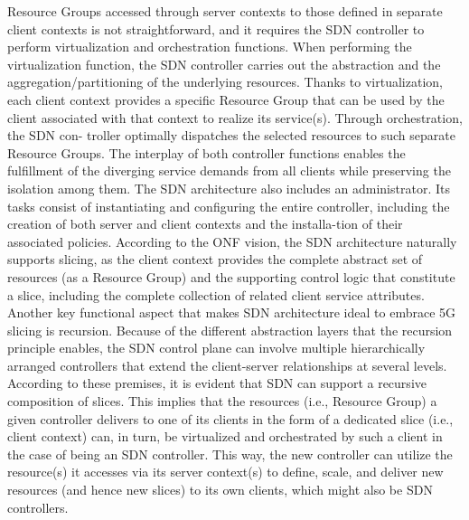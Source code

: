 \documentclass{article}
\begin{document}
Resource Groups accessed through server contexts to those defined in separate client contexts
is not straightforward, and it requires the SDN
controller to perform virtualization and orchestration functions.
When performing the virtualization function, the
SDN controller carries out the abstraction and the
aggregation/partitioning of the underlying resources. Thanks to virtualization, each client context provides a specific Resource Group that can be used by the client associated with that context to realize
its service(s). Through orchestration, the SDN con-
troller optimally dispatches the selected resources
to such separate Resource Groups. The interplay
of both controller functions enables the fulfillment
of the diverging service demands from all clients
while preserving the isolation among them.
The SDN architecture also includes an administrator. Its tasks consist of instantiating and configuring the entire controller, including the creation
of both server and client contexts and the installa-tion of their associated policies.
According to the ONF vision, the SDN architecture naturally supports slicing, as the client context provides the complete abstract set of resources
(as a Resource Group) and the supporting control
logic that constitute a slice, including the complete
collection of related client service attributes.
Another key functional aspect that makes SDN
architecture ideal to embrace 5G slicing is recursion. Because of the different abstraction layers
that the recursion principle enables, the SDN
control plane can involve multiple hierarchically
arranged controllers that extend the client-server
relationships at several levels. According to
these premises, it is evident that SDN can support a
recursive composition of slices. This implies that
the resources (i.e., Resource Group) a given controller delivers to one of its clients in the form of a
dedicated slice (i.e., client context) can, in turn, be
virtualized and orchestrated by such a client in the
case of being an SDN controller. This way, the new
controller can utilize the resource(s) it accesses via
its server context(s) to define, scale, and deliver
new resources (and hence new slices) to its own
clients, which might also be SDN controllers.
\end{document}
